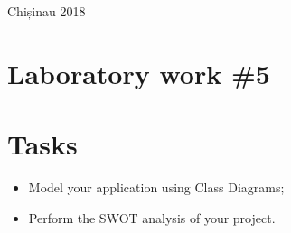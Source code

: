 \documentclass[12pt,a4paper,titlepage]{article}
\begin{document}
\begin{titlepage}
\begin{center}
      \vspace{5 mm}


      {\large Chișinau 2018}\\[3cm] %




      \vfill %
      \end{center}
      
\end{titlepage}

\cleardoublepage

\newpage

\setcounter{page}{1}
\setcounter{secnumdepth}{4}

\cleardoublepage


{}
\section*{Laboratory work \#5}

\section{Tasks}
\begin{itemize}
	\item
	Model your application using Class Diagrams;
	\item 
	Perform the SWOT analysis of your project.
\end{itemize}
\end{document}
